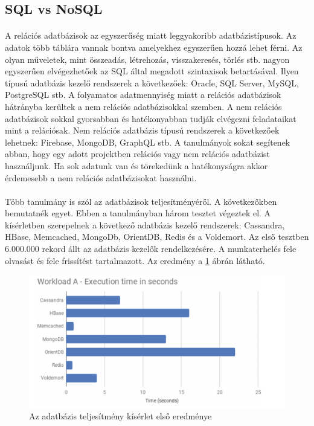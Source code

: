 	\subsection{SQL vs NoSQL}
	\paragraph{}
	A relációs adatbázisok az egyszerűség miatt leggyakoribb adatbázistípusok. Az adatok több táblára vannak bontva amelyekhez egyszerűen hozzá lehet férni. Az olyan műveletek, mint összeadás, létrehozás, visszakeresés, törlés stb. nagyon egyszerűen elvégezhetőek az SQL által megadott szintaxisok betartásával. Ilyen típusú adatbázis kezelő rendszerek a következőek: Oracle, SQL Server, MySQL, PostgreSQL stb. A folyamatos adatmennyiség miatt a relációs adatbázisok hátrányba kerültek a nem relációs adatbázisokkal szemben. A nem relációs adatbázisok sokkal gyorsabban és hatékonyabban tudják elvégezni feladataikat mint a relációsak. Nem relációs adatbázis típusú rendszerek a következőek lehetnek: Firebase, MongoDB, GraphQL stb.\cite{gupta2017nosql} A tanulmányok sokat segítenek abban, hogy egy adott projektben relációs vagy nem relációs adatbázist használjunk. Ha sok adatunk van és törekedünk a hatékonyságra akkor érdemesebb a nem relációs adatbázisokat használni. 
	\paragraph{}
	Több tanulmány is szól az adatbázisok teljesítményéről. A következőkben bemutatnék egyet. Ebben a tanulmányban három tesztet végeztek el. A kísérletben szerepelnek a következő adatbázis kezelő rendszerek: Cassandra, HBase, Memcached, MongoDb, OrientDB, Redis és a Voldemort.\cite{martins2019study} Az első tesztben 6.000.000 rekord állt az adatbázis kezelők rendelkezésére. A munkaterhelés fele olvasást és fele frissítést tartalmazott. Az eredmény a \ref{fig:performance_a} ábrán látható.
	
	\begin{figure}
		\centering
		\includegraphics[scale=0.6]{figures/images/performance_a.png}
		\caption{Az adatbázis teljesítmény kísérlet első eredménye \cite{martins2019study}}
		\label{fig:performance_a}
	\end{figure}
	


